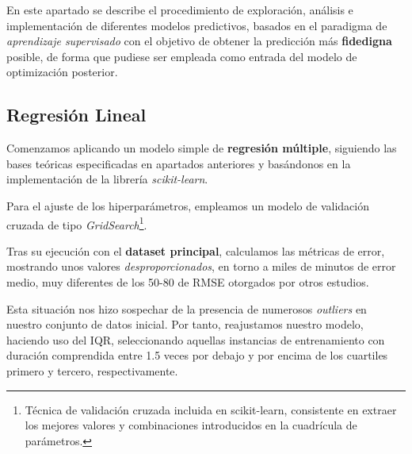 En este apartado se describe el procedimiento de exploración, análisis e implementación de diferentes modelos predictivos, basados en el paradigma de \textit{aprendizaje supervisado} con el objetivo de obtener la predicción más \textbf{fidedigna} posible, de forma que pudiese ser empleada como entrada del modelo de optimización posterior.


\subsection{Regresión Lineal}

Comenzamos aplicando un modelo simple de \textbf{regresión múltiple}, siguiendo las bases teóricas especificadas en apartados anteriores y basándonos en la implementación de la librería \textit{scikit-learn}\cite{2021Scikit-LearnPython}.

Para el ajuste de los hiperparámetros, empleamos un modelo de validación cruzada de tipo \textit{GridSearch}\footnote{Técnica de validación cruzada incluida en scikit-learn, consistente en extraer los mejores valores y combinaciones introducidos en la cuadrícula de parámetros.}.

Tras su ejecución con el \textbf{dataset principal}, calculamos las métricas de error, mostrando unos valores \textit{desproporcionados}, en torno a miles de minutos de error medio, muy diferentes de los 50-80 de RMSE otorgados por otros estudios\cite{ShahabiKargar2014PredictingSurgery}.


Esta situación nos hizo sospechar de la presencia de numerosos \textit{outliers} en nuestro conjunto de datos inicial. Por tanto, reajustamos nuestro modelo, haciendo uso del IQR\cite{Bonthu2021DetectingOutliers}, seleccionando aquellas instancias de entrenamiento con duración comprendida entre 1.5 veces por debajo y por encima de los cuartiles primero y tercero, respectivamente.


